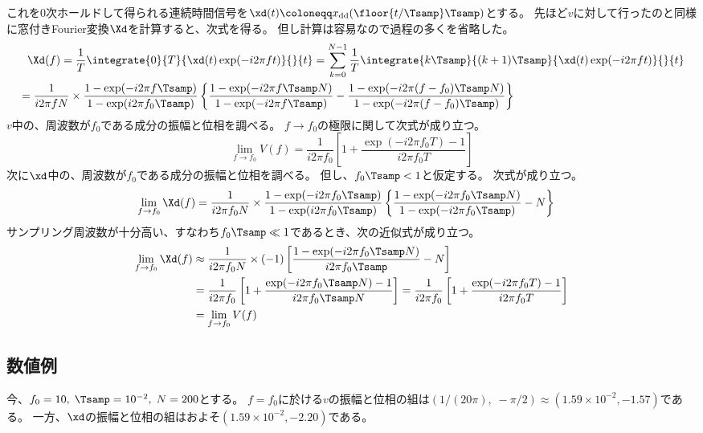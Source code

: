             これを0次ホールドして得られる連続時間信号を$\xd(t) \coloneqq \xdd(\floor{t/\Tsamp}\Tsamp)$とする。
            先ほど$v$に対して行ったのと同様に窓付きFourier変換$\Xd$を計算すると、次式を得る。
            但し計算は容易なので過程の多くを省略した。
            \begin{align*}
                &\phantom{=} \Xd(f) = \frac{1}{T} \integrate{0}{T}{\xd(t)\exp(-i 2\pi f t)}{}{t} = \sum_{k=0}^{N-1} \frac{1}{T} \integrate{k\Tsamp}{(k+1)\Tsamp}{\xd(t)\exp(-i 2\pi f t)}{}{t} \\
                &= \frac{1}{i 2\pi f N}\times\frac{1-\exp(-i 2\pi f\Tsamp)}{1-\exp(i 2\pi f_0\Tsamp)} \left\{\frac{1-\exp(-i 2\pi f \Tsamp N)}{1-\exp(-i 2\pi f \Tsamp)} - \frac{1-\exp(-i 2\pi (f-f_0) \Tsamp N)}{1-\exp(-i 2\pi (f-f_0) \Tsamp)}\right\}
            \end{align*}
            $v$中の、周波数が$f_0$である成分の振幅と位相を調べる。
            $f\to f_0$の極限に関して次式が成り立つ。
            \[ \lim_{f\to f_0} V(f) = \frac{1}{i2\pi f_0}\left[1 + \frac{\exp(-i 2\pi f_0 T)-1}{i 2\pi f_0 T}\right] \]
            次に$\xd$中の、周波数が$f_0$である成分の振幅と位相を調べる。
            但し、$f_0\Tsamp < 1$と仮定する。
            次式が成り立つ。
            \begin{align*}
                \lim_{f\to f_0} \Xd(f) &= \frac{1}{i 2\pi f_0 N}\times\frac{1-\exp(-i 2\pi f_0\Tsamp)}{1-\exp(i 2\pi f_0\Tsamp)}\left\{\frac{1-\exp(-i 2\pi f_0 \Tsamp N)}{1-\exp(-i 2\pi f_0 \Tsamp)} - N\right\}
            \end{align*}
            サンプリング周波数が十分高い、すなわち$f_0\Tsamp\ll 1$であるとき、次の近似式が成り立つ。
            \begin{align*}
                \lim_{f\to f_0} \Xd(f) &\approx \frac{1}{i 2\pi f_0 N}\times(-1)\left[\frac{1-\exp(-i 2\pi f_0 \Tsamp N)}{i 2\pi f_0 \Tsamp} - N\right] \\
                &= \frac{1}{i 2\pi f_0}\left[1 + \frac{\exp(-i 2\pi f_0 \Tsamp N)-1}{i 2\pi f_0 \Tsamp N}\right] = \frac{1}{i 2\pi f_0}\left[1 + \frac{\exp(-i 2\pi f_0 T)-1}{i 2\pi f_0 T}\right] \\
                &=  \lim_{f\to f_0} V(f)
            \end{align*}
        \subsection{数値例}
            今、$f_0=10,\;\Tsamp=10^{-2},\;N=200$とする。
            $f=f_0$に於ける$v$の振幅と位相の組は$(1/(20\pi),\;-\pi/2) \approx(1.59\times10^{-2},-1.57)$である。
            一方、$\xd$の振幅と位相の組はおよそ$(1.59\times10^{-2},-2.20)$である。

